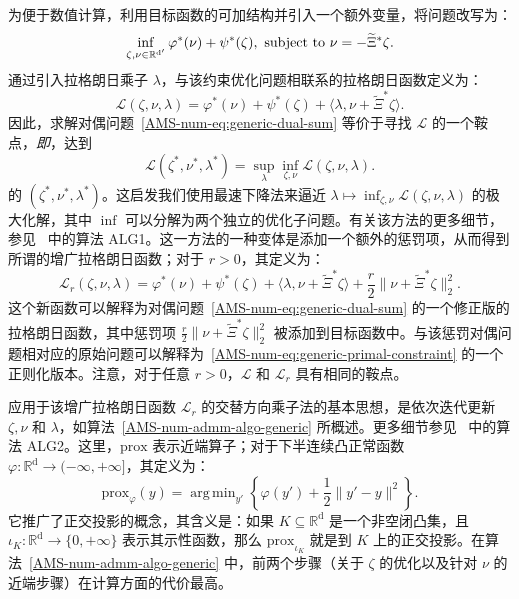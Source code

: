 \documentclass{amsproc}
\theoremstyle{definition}
\theoremstyle{remark}
\numberwithin{equation}{section}
\newcommand{\RR}{{\mathbb R}}
\newcommand{\cL}{{\mathcal L}}
\DeclareMathOperator*{\argmin}{arg\,min}
\newcommand{\prox}{\mathrm{prox}}
\begin{document}
为便于数值计算，利用目标函数的可加结构并引入一个额外变量，将问题改写为：
\begin{equation*}
	\inf_{\zeta, \nu \in \RR^{\mathrm{d}'}} \varphi^*(\nu) + \psi^*(\zeta), \hbox{ subject to } \nu = - \widetilde{\Xi}^* \zeta.
\end{equation*}
通过引入拉格朗日乘子 $\lambda$，与该约束优化问题相联系的拉格朗日函数定义为：
\begin{equation*}
	\cL(\zeta, \nu, \lambda) = \varphi^*(\nu) + \psi^*(\zeta) + \langle \lambda , \nu + \widetilde{\Xi}^* \zeta \rangle .
\end{equation*}
因此，求解对偶问题~\eqref{AMS-num-eq:generic-dual-sum} 等价于寻找 $\cL$ 的一个鞍点，\textit{即}，达到
\begin{equation}
\label{AMS-num-eq:generic-LagSaddlePoint}
	\cL(\zeta^*, \nu^*, \lambda^*) = \sup_{\lambda} \inf_{\zeta, \nu} \cL(\zeta, \nu, \lambda).
\end{equation}
的 $(\zeta^*, \nu^*, \lambda^*)$。这启发我们使用最速下降法来逼近 $\lambda \mapsto \inf_{\zeta, \nu} \cL(\zeta, \nu, \lambda)$ 的极大化解，其中 $\inf$ 可以分解为两个独立的优化子问题。有关该方法的更多细节，参见~\cite[Chapter 3]{MR724072} 中的算法 ALG1。这一方法的一种变体是添加一个额外的惩罚项，从而得到所谓的增广拉格朗日函数；对于 $r>0$，其定义为：
$$
	\cL_r(\zeta, \nu, \lambda) = \varphi^*(\nu) + \psi^*(\zeta) + \langle \lambda , \nu + \widetilde{\Xi}^* \zeta \rangle  + \frac{r}{2} \|\nu + \widetilde{\Xi}^* \zeta \|_2^2.
$$
这个新函数可以解释为对偶问题~\eqref{AMS-num-eq:generic-dual-sum} 的一个修正版的拉格朗日函数，其中惩罚项 $\frac{r}{2} \|\nu + \widetilde{\Xi}^* \zeta \|_2^2$ 被添加到目标函数中。与该惩罚对偶问题相对应的原始问题可以解释为~\eqref{AMS-num-eq:generic-primal-constraint} 的一个正则化版本。注意，对于任意 $r>0$，$\cL$ 和 $\cL_r$ 具有相同的鞍点。


应用于该增广拉格朗日函数 $\cL_r$ 的交替方向乘子法的基本思想，是依次迭代更新 $\zeta, \nu$ 和 $\lambda$，如算法~\ref{AMS-num-admm-algo-generic} 所概述。更多细节参见~\cite[Chapter 3]{MR724072} 中的算法 ALG2。这里，$\prox$ 表示近端算子；对于下半连续凸正常函数 $\varphi: \RR^{\mathrm{d}} \to (-\infty, +\infty]$，其定义为：
$$
	\prox_\varphi(y) = \argmin_{y'} \left\{ \varphi(y') + \frac{1}{2} \|y' - y\|^2\right\}.
$$
它推广了正交投影的概念，其含义是：如果 $K \subseteq \RR^{\mathrm{d}}$ 是一个非空闭凸集，且 $\iota_K: \RR^{\mathrm{d}} \to \{0,+\infty\}$ 表示其示性函数，那么 $\prox_{\iota_K}$ 就是到 $K$ 上的正交投影。在算法~\ref{AMS-num-admm-algo-generic} 中，前两个步骤（关于 $\zeta$ 的优化以及针对 $\nu$ 的近端步骤）在计算方面的代价最高。 
\end{document}
